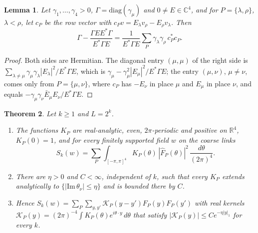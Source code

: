 \documentclass[11pt]{amsart}
\newtheorem{theorem}{Theorem}[section]
\newtheorem{lemma}[theorem]{Lemma}
\theoremstyle{definition}
\theoremstyle{remark}
\numberwithin{equation}{section}
\newcommand{\R}{\mathbb{R}}
\newcommand{\C}{\mathbb{C}}
\begin{document}
\begin{lemma}\label{lem:planes}
Let $\gamma_1,\dots,\gamma_4>0$, $\Gamma=\mathrm{diag}(\gamma_\mu)$ and
$0\ne E\in\C^4$, and for $P=\{\lambda,\rho\}$, $\lambda<\rho$, let $c_P$ be
the row vector with $c_Pv=E_\lambda v_\rho-E_\rho v_\lambda$. Then
\[
\Gamma-\frac{\Gamma EE^*\Gamma}{E^*\Gamma E}
=\frac1{E^*\Gamma E}\sum_P\gamma_\lambda\gamma_\rho\,c_P^*c_P .
\]
\end{lemma}

\begin{proof}
Both sides are Hermitian. The diagonal entry $(\mu,\mu)$ of the right side
is $\sum_{\lambda\ne\mu}\gamma_\mu\gamma_\lambda|E_\lambda|^2/E^*\Gamma E$,
which is $\gamma_\mu-\gamma_\mu^2|E_\mu|^2/E^*\Gamma E$; the entry
$(\mu,\nu)$, $\mu\ne\nu$, comes only from $P=\{\mu,\nu\}$, where
$c_P$ has $-E_\nu$ in place $\mu$ and $E_\mu$ in place $\nu$, and equals
$-\gamma_\mu\gamma_\nu\bar E_\mu E_\nu/E^*\Gamma E$.
\end{proof}

\begin{theorem}\label{thm:effectivelocal}
Let $k\ge1$ and $L=2^k$.
\begin{enumerate}[label=\textup{(\roman*)},leftmargin=*]
\item The functions $K_P$ are real-analytic, even, $2\pi$-periodic and
positive on $\R^4$, $K_P(0)=1$, and for every finitely supported field $w$
on the coarse links
\[
S_k(w)=\sum_P\int_{[-\pi,\pi]^4}K_P(\theta)\,|\hat F_P(\theta)|^2\,
\frac{d\theta}{(2\pi)^4}.
\]
\item There are $\eta>0$ and $C<\infty$, independent of $k$, such that
every $K_P$ extends analytically to $\{|\mathrm{Im}\,\theta_\nu|\le\eta\}$ and
is bounded there by $C$.
\item Hence $S_k(w)=\sum_P\sum_{y,y'}\mathcal K_P(y-y')F_P(y)F_P(y')$ with
real kernels $\mathcal K_P(y)=(2\pi)^{-4}\int K_P(\theta)e^{i\theta\cdot y}\,
d\theta$ that satisfy $|\mathcal K_P(y)|\le Ce^{-\eta|y|_1}$ for every $k$.
\end{enumerate}
\end{theorem}
\end{document}
